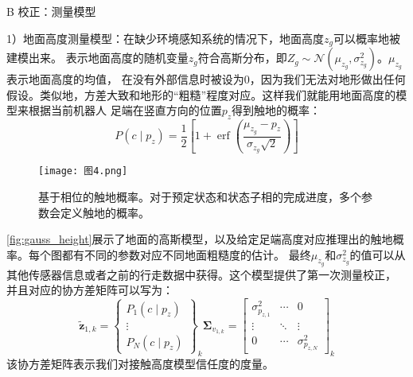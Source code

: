 B 校正：测量模型

1）地面高度测量模型：在缺少环境感知系统的情况下，地面高度$z_g$可以概率地被建模出来。
表示地面高度的随机变量$z_g$符合高斯分布，即$Z_g \sim \mathcal{N}\left(\mu_{z_g}, \sigma_{z_g}^2\right)$。$\mu_{z_g}$表示地面高度的均值，
在没有外部信息时被设为0，因为我们无法对地形做出任何假设。类似地，方差大致和地形的“粗糙”程度对应。这样我们就能用地面高度的模型来根据当前机器人
足端在竖直方向的位置$p_z$得到触地的概率：
\begin{equation}
    \label{equ:est_height_prob}
    P\left(c \mid p_z\right)=\frac{1}{2}\left[1+\operatorname{erf}\left(\frac{\mu_{z_g}-p_z}{\sigma_{z_g} \sqrt{2}}\right)\right]
\end{equation}
\begin{figure}[htbp]
    \centering
    \texttt{[image: 图4.png]}
    \caption{\label{fig:gauss_height}基于相位的触地概率。对于预定状态和状态子相的完成进度，多个参数会定义触地的概率。}
\end{figure}
\autoref{fig:gauss_height}展示了地面的高斯模型，以及给定足端高度对应推理出的触地概率。每个图都有不同的参数对应不同地面粗糙度的估计。
最终$\mu_{z_g}$和$\sigma_{z_g}^2$的值可以从其他传感器信息或者之前的行走数据中获得。这个模型提供了第一次测量校正，
并且对应的协方差矩阵可以写为：
\begin{equation}
    \label{equ:est_height_noise}
    \tilde{\boldsymbol{z}}_{1, k}=\left\{\begin{array}{c}
        P_1\left(c \mid p_z\right) \\
        \vdots \\
        P_N\left(c \mid p_z\right)
        \end{array}\right\}_k \boldsymbol{\Sigma}_{v_{1, k}}=\left[\begin{array}{ccc}
        \sigma_{p_{z, 1}}^2 & \cdots & 0 \\
        \vdots & \ddots & \vdots \\
        0 & \cdots & \sigma_{p_{z, N}}^2
        \end{array}\right]_k
\end{equation}
该协方差矩阵表示我们对接触高度模型信任度的度量。

